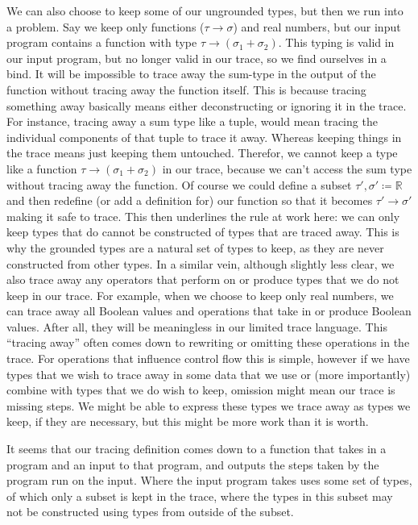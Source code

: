     We can also choose to keep some of our ungrounded types, but then we run into a problem.
    Say we keep only functions ($\tau\to\sigma$) and real numbers, but our input program contains a function with type $\tau\to(\sigma_1+\sigma_2)$.
    This typing is valid in our input program, but no longer valid in our trace, so we find ourselves in a bind.
    It will be impossible to trace away the sum-type in the output of the function without tracing away the function itself.
    This is because tracing something away basically means either deconstructing or ignoring it in the trace.
    For instance, tracing away a sum type like a tuple, would mean tracing the individual components of that tuple to trace it away.
    Whereas keeping things in the trace means just keeping them untouched.
    Therefor, we cannot keep a type like a function $\tau\to(\sigma_1+\sigma_2)$ in our trace, because we can't access the sum type without tracing away the function.
    Of course we could define a subset $\tau',\sigma'\coloneqq\mathbb{R}$ and then redefine (or add a definition for) our function so that it becomes $\tau'\to\sigma'$ making it safe to trace.
    This then underlines the rule at work here: we can only keep types that do cannot be constructed of types that are traced away.
    This is why the grounded types are a natural set of types to keep, as they are never constructed from other types.
    In a similar vein, although slightly less clear, we also trace away any operators that perform on or produce types that we do not keep in our trace.
    For example, when we choose to keep only real numbers, we can trace away all Boolean values and operations that take in or produce Boolean values.
    After all, they will be meaningless in our limited trace language.
    This ``tracing away'' often comes down to rewriting or omitting these operations in the trace.
    For operations that influence control flow this is simple, however if we have types that we wish to trace away in some data that we use or (more importantly) combine with types that we do wish to keep, omission might mean our trace is missing steps.
    We might be able to express these types we trace away as types we keep, if they are necessary, but this might be more work than it is worth.

    It seems that our tracing definition comes down to a function that takes in a program and an input to that program, and outputs the steps taken by the program run on the input.
    Where the input program takes uses some set of types, of which only a subset is kept in the trace, where the types in this subset may not be constructed using types from outside of the subset.

